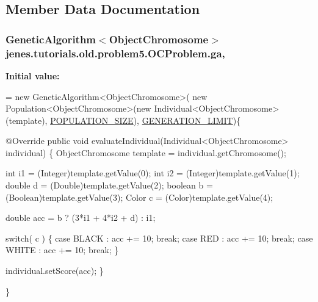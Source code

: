 \subsection{Member Data Documentation}
\hypertarget{classjenes_1_1tutorials_1_1old_1_1problem5_1_1_o_c_problem_af3e6937a8aa09bcde81d7c8e5a7fb6c2}{
\subsubsection[{ga}]{\setlength{\rightskip}{0pt plus 5cm}Genetic\-Algorithm$<${\bf Object\-Chromosome}$>$ jenes.\-tutorials.\-old.\-problem5.\-O\-C\-Problem.\-ga\hspace{0.3cm}{\ttfamily [static]}, {\ttfamily [private]}}}\label{classjenes_1_1tutorials_1_1old_1_1problem5_1_1_o_c_problem_af3e6937a8aa09bcde81d7c8e5a7fb6c2}
{\bfseries Initial value\-:}
\begin{DoxyCode}
=
            \textcolor{keyword}{new} GeneticAlgorithm<ObjectChromosome>( \textcolor{keyword}{new} Population<ObjectChromosome>(\textcolor{keyword}{new} 
      Individual<ObjectChromosome>(\textcolor{keyword}{template}), \hyperlink{classjenes_1_1tutorials_1_1old_1_1problem5_1_1_o_c_problem_af46aa659ca0eed22cbfabe28b78282d6}{POPULATION\_SIZE}), \hyperlink{classjenes_1_1tutorials_1_1old_1_1problem5_1_1_o_c_problem_a63d7a61bcda7da99c4588cc34165d115}{GENERATION\_LIMIT})\{
        
        @Override
        \textcolor{keyword}{public} \textcolor{keywordtype}{void} evaluateIndividual(Individual<ObjectChromosome> individual) \{
            ObjectChromosome \textcolor{keyword}{template} = individual.getChromosome();
            
            \textcolor{keywordtype}{int} i1 = (Integer)\textcolor{keyword}{template}.getValue(0);
            \textcolor{keywordtype}{int} i2 = (Integer)\textcolor{keyword}{template}.getValue(1);
            \textcolor{keywordtype}{double} d = (Double)\textcolor{keyword}{template}.getValue(2);
            \textcolor{keywordtype}{boolean} b = (Boolean)\textcolor{keyword}{template}.getValue(3);
            Color c = (Color)\textcolor{keyword}{template}.getValue(4);
            
            \textcolor{keywordtype}{double} acc = b ? (3*i1 + 4*i2 + d) : i1;
            
            \textcolor{keywordflow}{switch}( c ) \{
            \textcolor{keywordflow}{case} BLACK : acc += 10; \textcolor{keywordflow}{break};
            \textcolor{keywordflow}{case} RED   : acc += 10; \textcolor{keywordflow}{break};
            \textcolor{keywordflow}{case} WHITE : acc += 10; \textcolor{keywordflow}{break};
            \}
            
            individual.setScore(acc);
        \}
        
    \}
\end{DoxyCode}

